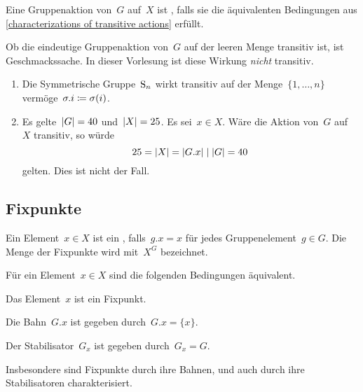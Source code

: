 \begin{definition}
  Eine Gruppenaktion von~$G$ auf~$X$ ist , falls sie die äquivalenten Bedingungen aus \cref{characterizations of transitive actions} erfüllt.
\end{definition}

\begin{warning}
  Ob die eindeutige Gruppenaktion von~$G$ auf der leeren Menge transitiv ist, ist Geschmackssache.
  In dieser Vorlesung ist diese Wirkung \emph{nicht} transitiv.
\end{warning}

\begin{example}
  \leavevmode
  \begin{enumerate}
    \item
      Die Symmetrische Gruppe~$\operatorname{S}_n$ wirkt transitiv auf der Menge~$\{1, \dotsc, n\}$ vermöge~$\sigma.i \coloneqq \sigma(i)$.
    \item
      Es gelte~$\lvert G\rvert = 40$ und~$\lvert X\rvert = 25$.
      Es sei~$x \in X$.
      Wäre die Aktion von~$G$ auf~$X$ transitiv, so würde
      \[
        25
        =
        \lvert X\rvert
        =
        \lvert G.x\rvert
        \mid
        \lvert G\rvert
        =
        40
      \]
      gelten.
      Dies ist nicht der Fall.
  \end{enumerate}
\end{example}



\subsection{Fixpunkte}

\begin{definition}
  Ein Element~$x \in X$ ist ein , falls~$g.x = x$ für jedes Gruppenelement~$g \in G$.
  Die Menge der Fixpunkte wird mit~$X^G$ bezeichnet.
\end{definition}

\begin{proposition}
  Für ein Element~$x \in X$ sind die folgenden Bedingungen äquivalent.
  \begin{equivlist}
    \item
      Das Element~$x$ ist ein Fixpunkt.
    \item
      Die Bahn~$G.x$ ist gegeben durch~$G.x = \{ x \}$.
    \item
      Der Stabilisator~$G_x$ ist gegeben durch~$G_x = G$.
  \end{equivlist}
  Insbesondere sind Fixpunkte durch ihre Bahnen, und auch durch ihre Stabilisatoren charakterisiert.
\end{proposition}




